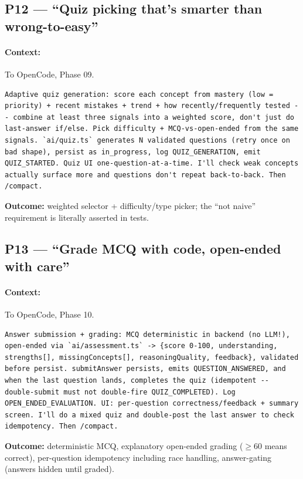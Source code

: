 \documentclass[11pt,a4paper]{article}
\begin{document}
\subsection{P12 --- ``Quiz picking that's smarter than wrong-to-easy''}
\paragraph{Context:} To OpenCode, Phase 09.
\begin{lstlisting}
Adaptive quiz generation: score each concept from mastery (low = priority) + recent mistakes + trend + how recently/frequently tested -- combine at least three signals into a weighted score, don't just do last-answer if/else. Pick difficulty + MCQ-vs-open-ended from the same signals. `ai/quiz.ts` generates N validated questions (retry once on bad shape), persist as in_progress, log QUIZ_GENERATION, emit QUIZ_STARTED. Quiz UI one-question-at-a-time. I'll check weak concepts actually surface more and questions don't repeat back-to-back. Then /compact.
\end{lstlisting}
\textbf{Outcome:} weighted selector + difficulty/type picker; the ``not naive'' requirement is literally asserted in tests.

\subsection{P13 --- ``Grade MCQ with code, open-ended with care''}
\paragraph{Context:} To OpenCode, Phase 10.
\begin{lstlisting}
Answer submission + grading: MCQ deterministic in backend (no LLM!), open-ended via `ai/assessment.ts` -> {score 0-100, understanding, strengths[], missingConcepts[], reasoningQuality, feedback}, validated before persist. submitAnswer persists, emits QUESTION_ANSWERED, and when the last question lands, completes the quiz (idempotent -- double-submit must not double-fire QUIZ_COMPLETED). Log OPEN_ENDED_EVALUATION. UI: per-question correctness/feedback + summary screen. I'll do a mixed quiz and double-post the last answer to check idempotency. Then /compact.
\end{lstlisting}
\textbf{Outcome:} deterministic MCQ, explanatory open-ended grading ($\geq$60 means correct), per-question idempotency including race handling, answer-gating (answers hidden until graded).
\end{document}

